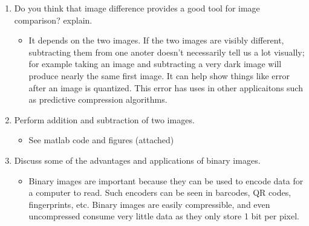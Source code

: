 \documentclass{article}
\begin{document}
\begin{enumerate}
  \item Do you think that image difference provides a good tool for image comparison? explain.
  \begin{itemize}
    \item It depends on the two images. If the two images are visibly different, subtracting them from one anoter doesn't necessarily tell us a lot visually; for example taking an image and subtracting a very dark image will produce nearly the same first image. It can help show things like error after an image is quantized. This error has uses in other applicaitons such as predictive compression algorithms.
  \end{itemize}

  \item Perform addition and subtraction of two images.
  \begin{itemize}
    \item See matlab code and figures (attached)
  \end{itemize}

  \item Discuss some of the advantages and applications of binary images.
  \begin{itemize}
    \item Binary images are important because they can be used to encode data for a computer to read. Such encoders can be seen in barcodes, QR codes, fingerprints, etc. Binary images are easily compressible, and even uncompressed consume very little data as they only store 1 bit per pixel.
  \end{itemize}
\end{enumerate}



\end{document}

